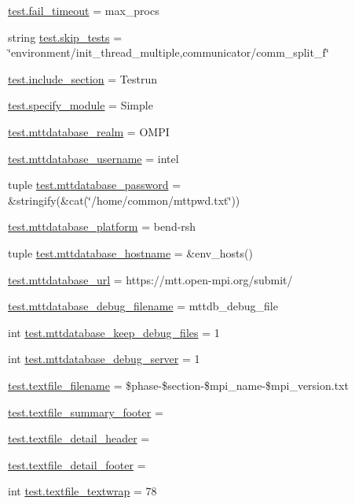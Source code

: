 \begin{DoxyCompactItemize}
\hyperlink{namespacetest_abfd7a3bf875f29c0fe5342e1345eef93}{test.\-fail\-\_\-timeout} = max\-\_\-procs
\item 
string \hyperlink{namespacetest_a92bc9c8909f4ebfd33da729397fa6669}{test.\-skip\-\_\-tests} = \char`\"{}environment/init\-\_\-thread\-\_\-multiple,communicator/comm\-\_\-split\-\_\-f\char`\"{}
\item 
\hyperlink{namespacetest_ab8d549258085b48d9a6ab8be50b86939}{test.\-include\-\_\-section} = Testrun
\item 
\hyperlink{namespacetest_a51dc8620c2e0770b19a7478de3cdfe9f}{test.\-specify\-\_\-module} = Simple
\item 
\hyperlink{namespacetest_a710122d20448f56ed2401cc3aa94ba04}{test.\-mttdatabase\-\_\-realm} = O\-M\-P\-I
\item 
\hyperlink{namespacetest_a7097267c4c5626a8f8e3376be40a9a92}{test.\-mttdatabase\-\_\-username} = intel
\item 
tuple \hyperlink{namespacetest_a51e535ad16f2253bc9fa6509c258a110}{test.\-mttdatabase\-\_\-password} = \&stringify(\&cat(\char`\"{}/home/common/mttpwd.\-txt\char`\"{}))
\item 
\hyperlink{namespacetest_ad84ae15a19ed5e82248ae54549e3d0d9}{test.\-mttdatabase\-\_\-platform} = bend-\/rsh
\item 
tuple \hyperlink{namespacetest_ade0bfe5e5627318e781e4d494c889bd3}{test.\-mttdatabase\-\_\-hostname} = \&env\-\_\-hosts()
\item 
\hyperlink{namespacetest_ad3dde693468cd5e08314bbab4c9f58ef}{test.\-mttdatabase\-\_\-url} = https\-://mtt.\-open-\/mpi.\-org/submit/
\item 
\hyperlink{namespacetest_ad8091a4ab1a4450f8e8c7039d81bbd92}{test.\-mttdatabase\-\_\-debug\-\_\-filename} = mttdb\-\_\-debug\-\_\-file
\item 
int \hyperlink{namespacetest_a9a41a6defd3632956b1fe345985788f6}{test.\-mttdatabase\-\_\-keep\-\_\-debug\-\_\-files} = 1
\item 
int \hyperlink{namespacetest_a3ac6ed984e10925873b601b7c08e0a17}{test.\-mttdatabase\-\_\-debug\-\_\-server} = 1
\item 
\hyperlink{namespacetest_a39cdd407082b44f6d5bf56c03b99a745}{test.\-textfile\-\_\-filename} = \$phase-\/\$section-\/\$mpi\-\_\-name-\/\$mpi\-\_\-version.\-txt
\item 
\hyperlink{namespacetest_a9cf6c35d175b44931bbc0e7ee120ba6d}{test.\-textfile\-\_\-summary\-\_\-footer} =
\item 
\hyperlink{namespacetest_a1149fe2728a88b0d33fdd5606ce953b2}{test.\-textfile\-\_\-detail\-\_\-header} =
\item 
\hyperlink{namespacetest_a26400b6c12ab57d038c2ecc468f19645}{test.\-textfile\-\_\-detail\-\_\-footer} =
\item 
int \hyperlink{namespacetest_a8f79316c7cc4b1d1ed80e5dbb71a8249}{test.\-textfile\-\_\-textwrap} = 78
\end{DoxyCompactItemize}
